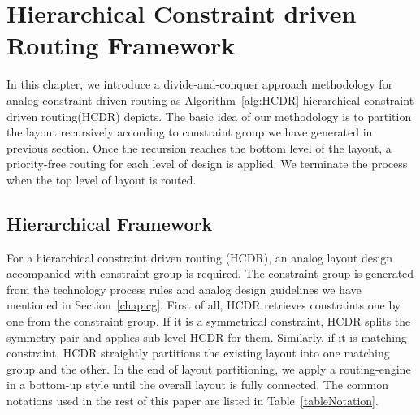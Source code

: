 \chapter{Hierarchical Constraint driven Routing Framework}\label{chap:hcdr}
    In this chapter, we introduce a divide-and-conquer approach methodology for analog constraint driven routing as Algorithm~\ref{alg:HCDR} hierarchical constraint driven routing(HCDR) depicts. The basic idea of our methodology is to partition the layout recursively according to constraint group we have generated in previous section. Once the recursion reaches the bottom level of the layout, a priority-free routing for each level of design is applied. We terminate the process when the top level of layout is routed. 

  \section{Hierarchical Framework}\label{sec:HierFramework}

    For a hierarchical constraint driven routing (HCDR), an analog layout design accompanied with constraint group is required. The constraint group is generated from the technology process rules and analog design guidelines we have mentioned in Section~\ref{chap:cg}. First of all, HCDR retrieves constraints one by one from the constraint group. If it is a symmetrical constraint, HCDR splits the symmetry pair and applies sub-level HCDR for them. Similarly, if it is matching constraint, HCDR straightly partitions the existing layout into one matching group and the other. In the end of layout partitioning, we apply a routing-engine in a bottom-up style until the overall layout is fully connected. The common notations used in the rest of this paper are listed in Table~\ref{tableNotation}.

